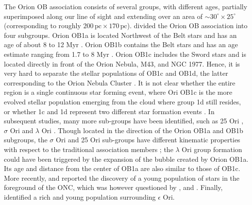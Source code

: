 \documentclass[onecolumn]{aa} %
\begin{document}
The Orion OB association consists of several groups, with different ages, partially superimposed along our line of sight \citep{Bally2008} and extending over an area of $\sim 30^{\circ} \times 25^{\circ}$ (corresponding to roughly $200 \, \mathrm{pc}\times 170 \, \mathrm{pc}$). 
\cite{Blaauw1964} divided the Orion OB association into four subgroups. Orion OB1a is located Northwest of the Belt stars and has an age of about 8 to 12 Myr \citep{Brown1994}. Orion OB1b contains the Belt stars and has an age estimate ranging from 1.7 to 8 Myr \citep{Brown1994, Bally2008}. Orion OB1c \citep[estimated age from 2 to 6 Myr]{Bally2008} includes the Sword stars and  is located directly in front of the Orion Nebula, M43, and NGC 1977. Hence, it is very hard to separate the stellar populations of OB1c and OB1d, the latter corresponding to the Orion Nebula Cluster \citep[ONC, see e.g.][]{DaRio2014}. It is not clear whether the entire region is a single continuous star forming event, where Ori OB1c is the more evolved stellar population emerging from the cloud where group 1d still resides, or whether 1c and 1d represent two different star formation events \citep[see e.g.][]{Muench2008}. 
In subsequent studies, many more sub-groups have been identified, such as  25 Ori \citep{Briceno2007}, $\sigma$ Ori \citep{Walter2008} and $\lambda$ Ori \citep{Mathieu2008}. Though located in the direction of the Orion OB1a and OB1b subgroups, the $\sigma$ Ori and 25 Ori sub-groups have different kinematic properties with respect to the traditional association members \citep{Briceno2007, Jeffries2006}; the $\lambda$ Ori group \citep{Mathieu2008} formation could have been triggered by the expansion of the bubble created by Orion OB1a. Its age and distance from the center of OB1a are also similar to those of OB1c.
More recently, \cite{Alves2012} and \cite{Bouy2014}  reported the discovery of a young population of stars in the foreground of the ONC, which was however questioned by \citet{DaRio2016}, \cite{Fang2017} and \cite{Kounkel2017b}. Finally, \cite{Kubiak2016} identified a rich and young population surrounding $\epsilon$ Ori. 
\end{document}
